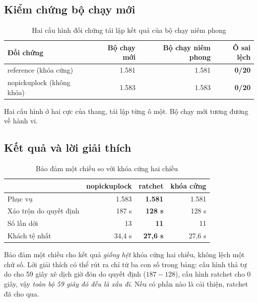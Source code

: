 \subsection{Kiểm chứng bộ chạy mới}

\begin{table}[htbp]
\centering
\caption{Hai cấu hình đối chứng tái lập kết quả của bộ chạy niêm phong}
\label{bang:doichung}
\small
\begin{tabular}{@{}lrrr@{}}
\toprule
\textbf{Đối chứng} & \textbf{Bộ chạy mới} & \textbf{Bộ chạy niêm phong} & \textbf{Ô sai lệch}\\
\midrule
reference (khóa cứng) & 1.581 & 1.581 & \textbf{0/20}\\
nopickuplock (không khóa) & 1.583 & 1.583 & \textbf{0/20}\\
\bottomrule
\end{tabular}
\end{table}

Hai cấu hình ở hai cực của thang, tái lập từng ô một. Bộ chạy mới tương đương về hành vi.

\subsection{Kết quả và lời giải thích}

\begin{table}[htbp]
\centering
\caption{Bảo đảm một chiều so với khóa cứng hai chiều}
\label{bang:ratchet}
\small
\begin{tabular}{@{}lrrr@{}}
\toprule
& \textbf{nopickuplock} & \textbf{ratchet} & \textbf{khóa cứng}\\
\midrule
Phục vụ & 1.583 & \textbf{1.581} & 1.581\\
Xáo trộn do quyết định & 187 s & \textbf{128 s} & 128 s\\
Số lần dời & 13 & \textbf{11} & 11\\
Khách tệ nhất & 34{,}4 s & \textbf{27{,}6 s} & 27{,}6 s\\
\bottomrule
\end{tabular}
\end{table}

Bảo đảm một chiều cho kết quả \emph{giống hệt} khóa cứng hai chiều, không lệch một chữ số. Lời
giải thích có thể rút ra chỉ từ ba con số trong bảng: cấu hình thả tự do cho 59 giây xê dịch giờ
đón do quyết định ($187 - 128$), cấu hình ratchet cho 0 giây, vậy \emph{toàn bộ 59 giây đó đều
là xấu đi}. Nếu có phần nào là cải thiện, ratchet đã cho qua.

